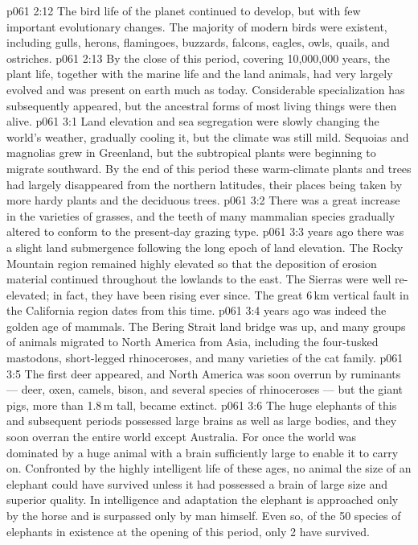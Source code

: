 \vs p061 2:12 The bird life of the planet continued to develop, but with few important evolutionary changes. The majority of modern birds were existent, including gulls, herons, flamingoes, buzzards, falcons, eagles, owls, quails, and ostriches.
\vs p061 2:13 \pc By the close of this  period, covering 10,000,000 years, the plant life, together with the marine life and the land animals, had very largely evolved and was present on earth much as today. Considerable specialization has subsequently appeared, but the ancestral forms of most living things were then alive.
\vs p061 3:1 Land elevation and sea segregation were slowly changing the world’s weather, gradually cooling it, but the climate was still mild. Sequoias and magnolias grew in Greenland, but the subtropical plants were beginning to migrate southward. By the end of this period these warm\hyp{}climate plants and trees had largely disappeared from the northern latitudes, their places being taken by more hardy plants and the deciduous trees.
\vs p061 3:2 There was a great increase in the varieties of grasses, and the teeth of many mammalian species gradually altered to conform to the present\hyp{}day grazing type.
\vs p061 3:3 \pc {} years ago there was a slight land submergence following the long epoch of land elevation. The Rocky Mountain region remained highly elevated so that the deposition of erosion material continued throughout the lowlands to the east. The Sierras were well re\hyp{}elevated; in fact, they have been rising ever since. The great 6\,km vertical fault in the California region dates from this time.
\vs p061 3:4 \pc {} years ago was indeed the golden age of mammals. The Bering Strait land bridge was up, and many groups of animals migrated to North America from Asia, including the four\hyp{}tusked mastodons, short\hyp{}legged rhinoceroses, and many varieties of the cat family.
\vs p061 3:5 The first deer appeared, and North America was soon overrun by ruminants --- deer, oxen, camels, bison, and several species of rhinoceroses --- but the giant pigs, more than 1.8\,m tall, became extinct.
\vs p061 3:6 The huge elephants of this and subsequent periods possessed large brains as well as large bodies, and they soon overran the entire world except Australia. For once the world was dominated by a huge animal with a brain sufficiently large to enable it to carry on. Confronted by the highly intelligent life of these ages, no animal the size of an elephant could have survived unless it had possessed a brain of large size and superior quality. In intelligence and adaptation the elephant is approached only by the horse and is surpassed only by man himself. Even so, of the 50 species of elephants in existence at the opening of this period, only 2 have survived.

